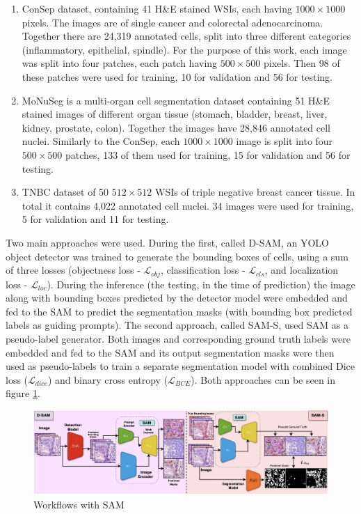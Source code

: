 \begin{enumerate}
    \item ConSep dataset, containing 41 H\&E stained WSIs, each having $1000\!\times\!1000$ pixels. The images are of single cancer and colorectal adenocarcinoma. Together there are 24,319 annotated cells, split into three different categories (inflammatory, epithelial, spindle). For the purpose of this work, each image was split into four patches, each patch having $500\!\times\!500$ pixels. Then 98 of these patches were used for training, 10 for validation and 56 for testing.
    \item MoNuSeg is a multi-organ cell segmentation dataset containing 51 H\&E stained images of different organ tissue (stomach, bladder, breast, liver, kidney, prostate, colon). Together the images have 28,846 annotated cell nuclei. Similarly to the ConSep, each $1000\!\times\!1000$ image is split into four $500\!\times\!500$ patches, 133 of them used for training, 15 for validation and 56 for testing.
    \item TNBC dataset of 50 $512\!\times\!512$ WSIs of triple negative breast cancer tissue. In total it contains 4,022 annotated cell nuclei. 34 images were used for training, 5 for validation and 11 for testing.
\end{enumerate}

Two main approaches were used. During the first, called D-SAM, an YOLO object detector was trained to generate the bounding boxes of cells, using a sum of three losses (objectness loss - $\mathcal{L}_{obj}$, classification loss - $\mathcal{L}_{cls}$, and localization loss - $\mathcal{L}_{loc}$). During the inference (the testing, in the time of prediction) the image along with bounding boxes predicted by the detector model were embedded and fed to the SAM to predict the segmentation masks (with bounding box predicted labels as guiding prompts). The second approach, called SAM-S, used SAM as a pseudo-label generator. Both images and corresponding ground truth labels were embedded and fed to the SAM and its output segmentation masks were then used as pseudo-labels to train a separate segmentation model with combined Dice loss ($\mathcal{L}_{dice}$) and binary cross entropy ($\mathcal{L}_{BCE}$). Both approaches can be seen in figure \ref{fig:rw-sam}. 

\begin{figure}[H]
    \begin{centering}
    \includegraphics[width=14cm]{assets/images/rw-sam.png}
    \par\end{centering}
    \caption{Workflows with SAM \cite{Shamshad2023}}
    \label{fig:rw-sam}
\end{figure}

